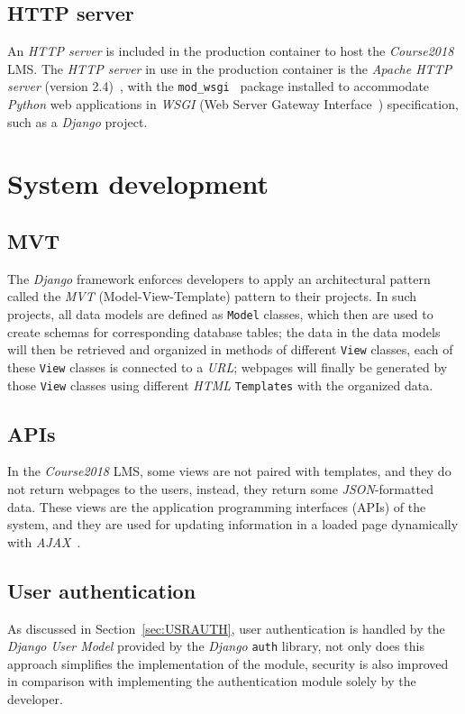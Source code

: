 \subsection{HTTP server}
An \emph{HTTP server} is included in the production container to host the
\emph{Course2018} LMS.
The \emph{HTTP server} in use in the production container is the
\emph{Apache HTTP server} (version 2.4)~\cite{apache}, with the
\texttt{mod\_wsgi}~\cite{wsgi} package installed to accommodate
\emph{Python} web applications in \emph{WSGI}
(Web Server Gateway Interface~\cite{wsgi}) specification, such as a
\emph{Django} project.

\section{System development}

\subsection{MVT}
\label{sec:MVT}
The \emph{Django} framework enforces developers to apply an architectural
pattern called the \emph{MVT} (Model-View-Template) pattern to their projects.
In such projects,
all data models are defined as \texttt{Model} classes, which
then are used to create schemas for corresponding database tables;
the data in the data models will then be retrieved and organized in 
methods of different \texttt{View} classes, each of these \texttt{View} classes
is connected to a \emph{URL};
webpages will finally be generated by those \texttt{View} classes
using different \emph{HTML} \texttt{Templates} with the organized data.

\subsection{APIs}
In the \emph{Course2018} LMS, some views are not paired with templates, and
they do not return webpages to the users, instead, they return some
\emph{JSON}-formatted data.
These views are the application programming interfaces (APIs) of the system,
and they are used for updating information in
a loaded page dynamically with \emph{AJAX}~\cite{AJAX}. 



\subsection{User authentication}
As discussed in Section~\ref{sec:USRAUTH}, user authentication is handled by the
\emph{Django User Model} provided by the \emph{Django} \texttt{auth} library,
not only does this approach simplifies the implementation of the module,
security is also improved in comparison with implementing the authentication
module solely by the developer.

